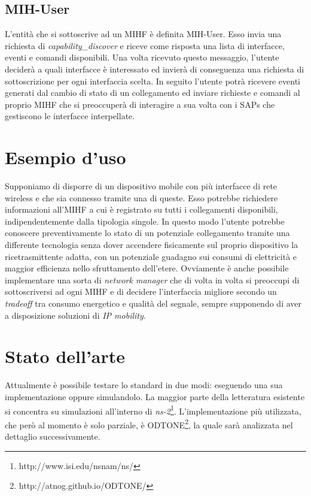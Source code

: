 \subsection{MIH-User}
L'entità che si sottoscrive ad un MIHF è definita MIH-User. Esso invia una richiesta di {\em capability\_discover} e riceve come risposta una lista di interfacce, eventi e comandi disponibili. Una volta ricevuto questo messaggio, l'utente deciderà a quali interfacce è interessato ed invierà di conseguenza una richiesta di sottoscrizione per ogni interfaccia scelta. In seguito l'utente potrà ricevere eventi generati dal cambio di stato di un collegamento ed inviare richieste e comandi al proprio MIHF che si preoccuperà di interagire a sua volta con i SAPs che gestiscono le interfacce interpellate.

\section{Esempio d'uso}
Supponiamo di disporre di un dispositivo mobile con più interfacce di rete wireless e che sia connesso tramite una di queste. Esso potrebbe richiedere informazioni all'MIHF a cui è registrato su tutti i  collegamenti disponibili, indipendentemente dalla tipologia singole. In questo modo l'utente potrebbe conoscere preventivamente lo stato di un potenziale collegamento tramite una differente tecnologia senza dover accendere fisicamente sul proprio dispositivo la ricetrasmittente adatta, con un potenziale guadagno sui consumi di elettricità e maggior efficienza nello sfruttamento dell'etere. Ovviamente è anche possibile implementare una sorta di {\em network manager} che di volta in volta si preoccupi di sottoscriversi ad ogni MIHF e di decidere l'interfaccia migliore secondo un {\em tradeoff} tra consumo energetico e qualità del segnale, sempre supponendo di aver a disposizione soluzioni di {\em IP mobility}.

\section{Stato dell'arte}
Attualmente è possibile testare lo standard in due modi: eseguendo una sua implementazione oppure simulandolo. La maggior parte della letteratura esistente si concentra su simulazioni all'interno di {\em ns-2}\footnote{http://www.isi.edu/nsnam/ns/}. L'implementazione più utilizzata, che però al momento è solo parziale, è ODTONE\footnote{http://atnog.github.io/ODTONE/}, la quale sarà analizzata nel dettaglio successivamente.